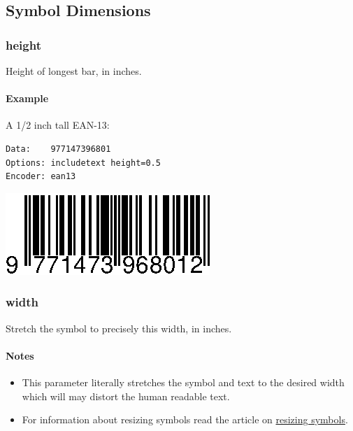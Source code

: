 \hypertarget{symbol-dimensions}{%
\subsection{Symbol Dimensions}\label{symbol-dimensions}}

\hypertarget{height}{%
\subsubsection{height}\label{height}}

Height of longest bar, in inches.

\hypertarget{example-29}{%
\paragraph{Example}\label{example-29}}

A 1/2 inch tall EAN-13:

\begin{verbatim}
Data:    977147396801
Options: includetext height=0.5
Encoder: ean13
\end{verbatim}

\includegraphics{images/optheight.eps}

\hypertarget{width}{%
\subsubsection{width}\label{width}}

Stretch the symbol to precisely this width, in inches.

\hypertarget{notes-1}{%
\paragraph{Notes}\label{notes-1}}

\begin{itemize}
\tightlist
\item
  This parameter literally stretches the symbol and text to the desired
  width which will may distort the human readable text.
\item
  For information about resizing symbols read the article on
  \protect\hyperlink{resizing-symbols}{resizing symbols}.
\end{itemize}

